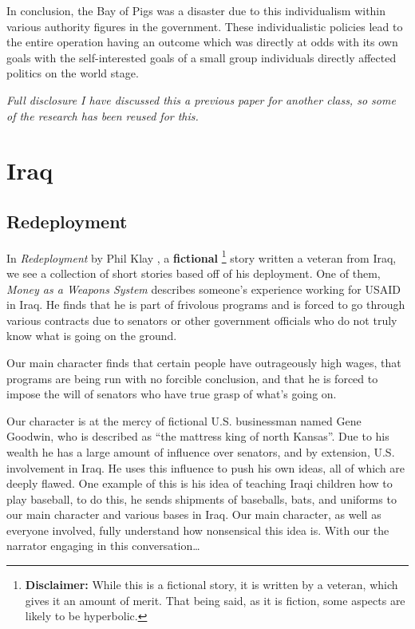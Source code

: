 \documentclass[12pt]{article}
\begin{document}
    In conclusion, the Bay of Pigs was a disaster due to this individualism within various authority figures in the government. These individualistic policies lead to the entire operation having an outcome which was directly at odds with its own goals with the self-interested goals of a small group individuals directly affected politics on the world stage.  

    \textit{Full disclosure I have discussed this a previous paper for another class, so some of the research has been reused for this.}

\section{Iraq}

    \subsection{Redeployment}
        In \textit{Redeployment} by Phil Klay \parencite{Klay2014}, a \textbf{fictional} \footnote{\textbf{Disclaimer:} While this is a fictional story, it is written by a veteran, which gives it an amount of merit. That being said, as it is fiction, some aspects are likely to be hyperbolic.} 
        story written a veteran from Iraq, we see a collection of short stories based off of his deployment. One of them, \textit{Money as a Weapons System} describes someone's experience working for USAID in Iraq. He finds that he is part of frivolous programs and is forced to  go through various contracts due to senators or other government officials who do not truly know what is going on the ground. 

        Our main character finds that certain people have outrageously high wages, that programs are being run with no forcible conclusion, and that he is forced to impose the will of senators who have true grasp of what's going on. 

        Our character is at the mercy of fictional U.S. businessman named Gene Goodwin, who is described as ``the mattress king of north Kansas''. Due to his wealth he has a large amount of influence over senators, and by extension, U.S. involvement in Iraq. He uses this influence to push his own ideas, all of which are deeply flawed. One example of this is his idea of teaching Iraqi children how to play baseball, to do this, he sends shipments of baseballs, bats, and uniforms to our main character and various bases in Iraq. Our main character, as well as everyone involved, fully understand how nonsensical this idea is. With our the narrator engaging in this conversation\ldots
        
\end{document}
